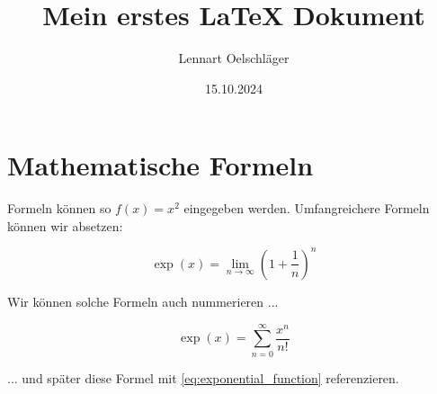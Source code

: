 \documentclass{article}
\title{Mein erstes LaTeX Dokument}
\author{Lennart Oelschläger}
\date{15.10.2024}
\begin{document}
\maketitle

\section{Mathematische Formeln}

Formeln können so $f(x) = x^2$ eingegeben werden. Umfangreichere Formeln können wir absetzen:

$$ \exp(x) =  \lim_{n \to \infty} \left( 1 + \frac{1}{n} \right)^n $$

Wir können solche Formeln auch nummerieren ...

\begin{equation}
    \label{eq:exponential_function}
    \exp(x) = \sum_{n = 0}^\infty \frac{x^n}{n!}
\end{equation}

... und später diese Formel mit \eqref{eq:exponential_function} referenzieren.
\end{document}
